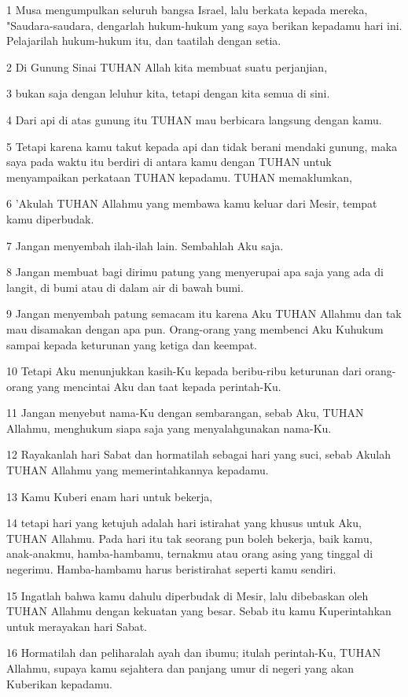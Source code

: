 \par 1 Musa mengumpulkan seluruh bangsa Israel, lalu berkata kepada mereka, "Saudara-saudara, dengarlah hukum-hukum yang saya berikan kepadamu hari ini. Pelajarilah hukum-hukum itu, dan taatilah dengan setia.
\par 2 Di Gunung Sinai TUHAN Allah kita membuat suatu perjanjian,
\par 3 bukan saja dengan leluhur kita, tetapi dengan kita semua di sini.
\par 4 Dari api di atas gunung itu TUHAN mau berbicara langsung dengan kamu.
\par 5 Tetapi karena kamu takut kepada api dan tidak berani mendaki gunung, maka saya pada waktu itu berdiri di antara kamu dengan TUHAN untuk menyampaikan perkataan TUHAN kepadamu. TUHAN memaklumkan,
\par 6 'Akulah TUHAN Allahmu yang membawa kamu keluar dari Mesir, tempat kamu diperbudak.
\par 7 Jangan menyembah ilah-ilah lain. Sembahlah Aku saja.
\par 8 Jangan membuat bagi dirimu patung yang menyerupai apa saja yang ada di langit, di bumi atau di dalam air di bawah bumi.
\par 9 Jangan menyembah patung semacam itu karena Aku TUHAN Allahmu dan tak mau disamakan dengan apa pun. Orang-orang yang membenci Aku Kuhukum sampai kepada keturunan yang ketiga dan keempat.
\par 10 Tetapi Aku menunjukkan kasih-Ku kepada beribu-ribu keturunan dari orang-orang yang mencintai Aku dan taat kepada perintah-Ku.
\par 11 Jangan menyebut nama-Ku dengan sembarangan, sebab Aku, TUHAN Allahmu, menghukum siapa saja yang menyalahgunakan nama-Ku.
\par 12 Rayakanlah hari Sabat dan hormatilah sebagai hari yang suci, sebab Akulah TUHAN Allahmu yang memerintahkannya kepadamu.
\par 13 Kamu Kuberi enam hari untuk bekerja,
\par 14 tetapi hari yang ketujuh adalah hari istirahat yang khusus untuk Aku, TUHAN Allahmu. Pada hari itu tak seorang pun boleh bekerja, baik kamu, anak-anakmu, hamba-hambamu, ternakmu atau orang asing yang tinggal di negerimu. Hamba-hambamu harus beristirahat seperti kamu sendiri.
\par 15 Ingatlah bahwa kamu dahulu diperbudak di Mesir, lalu dibebaskan oleh TUHAN Allahmu dengan kekuatan yang besar. Sebab itu kamu Kuperintahkan untuk merayakan hari Sabat.
\par 16 Hormatilah dan peliharalah ayah dan ibumu; itulah perintah-Ku, TUHAN Allahmu, supaya kamu sejahtera dan panjang umur di negeri yang akan Kuberikan kepadamu.
